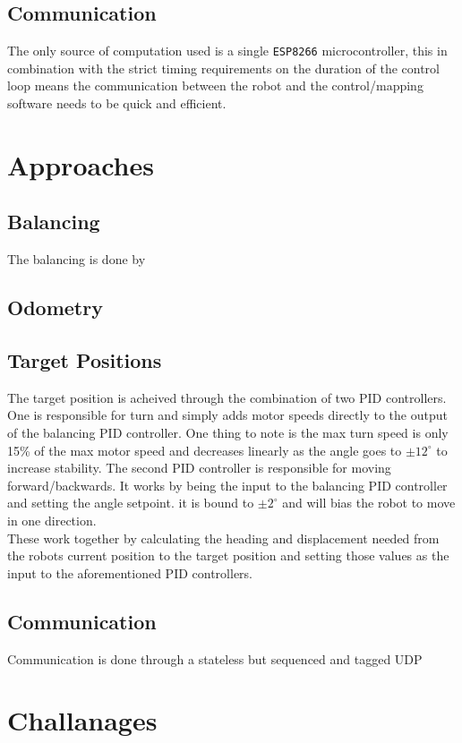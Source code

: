 \documentclass[12pt]{article}
\begin{document}
\subsection{Communication}
The only source of computation used is a single \texttt{ESP8266} microcontroller, this in combination with the strict timing requirements on the duration of the control loop means the communication between the robot and the control/mapping software needs to be quick and efficient.

\section{Approaches}


\subsection{Balancing}
The balancing is done by
\subsection{Odometry}
\subsection{Target Positions}
The target position is acheived through the combination of two PID controllers. One is responsible for turn and simply adds motor speeds directly to the output of the balancing PID controller. One thing to note is the max turn speed is only 15\% of the max motor speed and decreases linearly as the angle goes to $\pm12^\circ$ to increase stability. The second PID controller is responsible for moving forward/backwards. It works by being the input to the balancing PID controller and setting the angle setpoint. it is bound to $\pm2^\circ$ and will bias the robot to move in one direction.\\
These work together by calculating the heading and displacement needed from the robots current position to the target position and setting those values as the input to the aforementioned PID controllers.
\subsection{Communication}
Communication is done through a stateless but sequenced and tagged UDP 

\section{Challanages}
\end{document}
